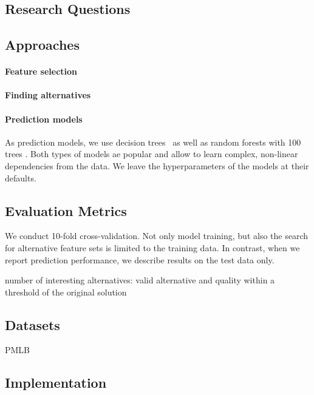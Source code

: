 \documentclass{article}
\theoremstyle{definition}
\begin{document}
\subsection{Research Questions}

\subsection{Approaches}

\paragraph{Feature selection}

\paragraph{Finding alternatives}

\paragraph{Prediction models}

As prediction models, we use decision trees~\cite{breiman1984classification} as well as random forests with 100 trees \cite{breiman2001random}.
Both types of models ae popular and allow to learn complex, non-linear dependencies from the data.
We leave the hyperparameters of the models at their defaults.

\subsection{Evaluation Metrics}

We conduct 10-fold cross-validation.
Not only model training, but also the search for alternative feature sets is limited to the training data.
In contrast, when we report prediction performance, we describe results on the test data only.

number of interesting alternatives: valid alternative and quality within a threshold of the original solution

\subsection{Datasets}

PMLB \cite{olson2017pmlb, romano2021pmlb}

\subsection{Implementation}
\end{document}
